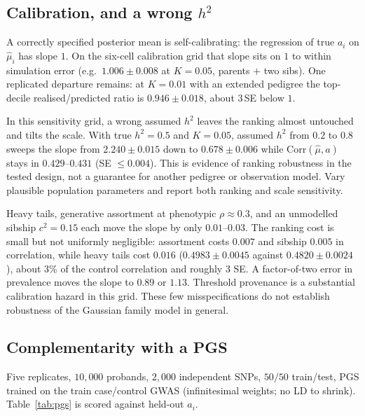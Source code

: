 \documentclass[11pt,a4paper]{article}
\newcommand{\Corr}{\mathrm{Corr}}
\newcommand{\h}{h^{2}}
\begin{document}
\subsection{Calibration, and a wrong $\h$}

A correctly specified posterior mean is self-calibrating: the
regression of true $a_i$ on $\widehat{\mu}_i$ has slope $1$.
On the six-cell calibration grid that slope sits on $1$ to within
simulation error (e.g.\ $1.006\pm 0.008$ at $K=0.05$, parents $+$
two sibs).
One replicated departure remains: at $K=0.01$ with an extended
pedigree the top-decile realised/predicted ratio is
$0.946\pm 0.018$, about $3$\,SE below $1$.

In this sensitivity grid, a wrong assumed $\h$ leaves the ranking
almost untouched and tilts the scale.
With true $\h=0.5$ and $K=0.05$, assumed $\h$ from $0.2$ to $0.8$
sweeps the slope from $2.240\pm 0.015$ down to $0.678\pm 0.006$
while $\Corr(\widehat{\mu},a)$ stays in $0.429$--$0.431$
(SE $\le 0.004$).
This is evidence of ranking robustness in the tested design, not a
guarantee for another pedigree or observation model. Vary plausible
population parameters and report both ranking and scale sensitivity.

Heavy tails, generative assortment at phenotypic $\rho\approx 0.3$,
and an unmodelled sibship $c^{2}=0.15$ each move the slope by only
$0.01$--$0.03$.
The ranking cost is small but not uniformly negligible: assortment
costs $0.007$ and sibship $0.005$ in correlation, while heavy tails
cost $0.016$ ($0.4983\pm 0.0045$ against $0.4820\pm 0.0024$), about
$3\%$ of the control correlation and roughly $3$ SE.
A factor-of-two error in prevalence moves the slope to $0.89$ or
$1.13$.
Threshold provenance is a substantial calibration hazard in this
grid. These few misspecifications do not establish robustness of the
Gaussian family model in general.

\subsection{Complementarity with a PGS}

Five replicates, $10{,}000$ probands, $2{,}000$ independent SNPs,
$50/50$ train/test, PGS trained on the train case/control GWAS
(infinitesimal weights; no LD to shrink).
Table~\ref{tab:pgs} is scored against held-out $a_i$.

\begin{table}[ht]
\centering
\caption{PGS and classic LT-FH on a held-out test half.
$R^{2}$ is against true $a_i$.
The joint model is two-fold cross-fitted OLS on the two scores.}
\label{tab:pgs}
\small

\end{table}
\end{document}
